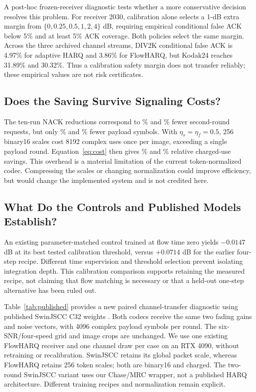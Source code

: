 \documentclass[conference]{IEEEtran}
\begin{document}
A post-hoc frozen-receiver diagnostic tests whether a more conservative
decision resolves this problem. For receiver 2030, calibration alone selects
a 1-dB extra margin from $\{0,0.25,0.5,1,2,4\}$ dB, requiring empirical
conditional false ACK below 5\% and at least 5\% ACK coverage. Both policies
select the same margin. Across the three archived channel streams, DIV2K
conditional false ACK is 4.97\% for adaptive HARQ and 3.86\% for FlowHARQ,
but Kodak24 reaches 31.89\% and 30.32\%. Thus a calibration safety margin
does not transfer reliably; these empirical values are not risk certificates.

\subsection{Does the Saving Survive Signaling Costs?}
The ten-run NACK reductions correspond to \DivRequestSaving\% and
\KodRequestSaving\% fewer second-round requests, but only
\DivPayloadSaving\% and \KodPayloadSaving\% fewer payload symbols. With
$\eta_s=\eta_f=0.5$, 256 binary16 scales cost 8192 complex uses once per
image, exceeding a single payload round. Equation~\eqref{eq:cost} then gives
\DivTotalSaving\% and \KodTotalSaving\% relative charged-use savings.
This overhead is a material limitation of the current token-normalized codec.
Compressing the scales or changing normalization could improve efficiency,
but would change the implemented system and is not credited here.



\subsection{What Do the Controls and Published Models Establish?}
An existing parameter-matched control trained at flow time zero yields
$-0.0147$ dB at its best tested calibration threshold, versus $+0.0714$ dB
for the earlier four-step recipe. Different time supervision and threshold
selection prevent isolating integration depth. This calibration comparison
supports retaining the measured recipe, not claiming that flow matching is
necessary or that a held-out one-step alternative has been ruled out.

Table~\ref{tab:published} provides a new paired channel-transfer diagnostic
using published SwinJSCC C32 weights \cite{swinjscc}. Both codecs receive
the same two fading gains and noise vectors, with 4096 complex payload symbols
per round. The six-SNR/four-speed grid and image crops are unchanged. We use
one existing FlowHARQ receiver and one channel draw per case on an RTX 4090,
without retraining or recalibration. SwinJSCC retains its global packet scale,
whereas FlowHARQ retains 256 token scales; both are binary16 and charged.
The two-round SwinJSCC variant uses our Chase/MRC wrapper, not a published
HARQ architecture. Different training recipes and normalization remain explicit.
\end{document}
